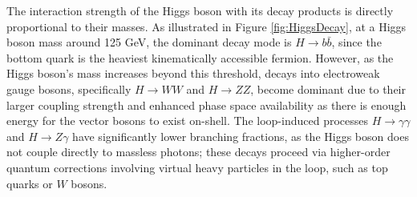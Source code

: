 The interaction strength of the Higgs boson with its decay products is directly proportional to their masses. As illustrated in Figure \ref{fig:HiggsDecay}, at a Higgs boson mass around 125 GeV, the dominant decay mode is \( H \to b\bar{b} \), since the bottom quark is the heaviest kinematically accessible fermion. However, as the Higgs boson's mass increases beyond this threshold, decays into electroweak gauge bosons, specifically \( H \to WW \) and \( H \to ZZ \), become dominant due to their larger coupling strength and enhanced phase space availability as there is enough energy for the vector bosons to exist on-shell. The loop-induced processes \( H \to \gamma\gamma \) and \( H \to Z\gamma \) have significantly lower branching fractions, as the Higgs boson does not couple directly to massless photons; these decays proceed via higher-order quantum corrections involving virtual heavy particles in the loop, such as top quarks or \( W \) bosons.

